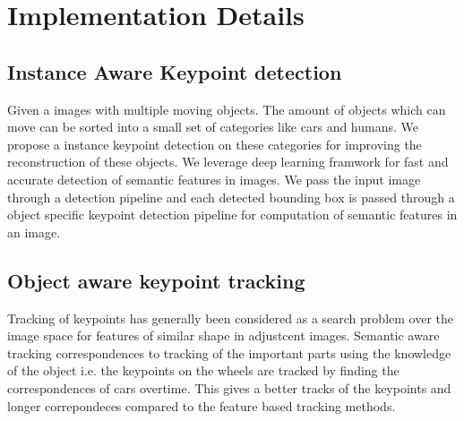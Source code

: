 \documentclass[10pt,twocolumn,letterpaper]{article}
\begin{document}
\section{Implementation Details}

\subsection{Instance Aware Keypoint detection}
\label{sec:keypoint}
Given a images with multiple moving objects. The amount of objects which can move can be sorted into a small set of categories like cars and humans. We propose a instance keypoint detection on these categories for improving the reconstruction of these objects. We leverage deep learning framwork for fast and accurate detection of semantic features in images. We pass the input image through a detection pipeline and each detected bounding box is passed through a object specific keypoint detection pipeline for computation of semantic features in an image.  

\subsection{Object aware keypoint tracking}
\label{sec:track}
Tracking of keypoints has generally been considered as a search problem over the image space for features of similar shape in adjustcent images. Semantic aware tracking correspondences to tracking of the important parts using the knowledge of the object i.e. the keypoints on the wheels are tracked by finding the correspondences of cars overtime. This gives a better tracks of the keypoints and longer correpondeces compared to the feature based tracking methods. 

{\small


}
\end{document}
